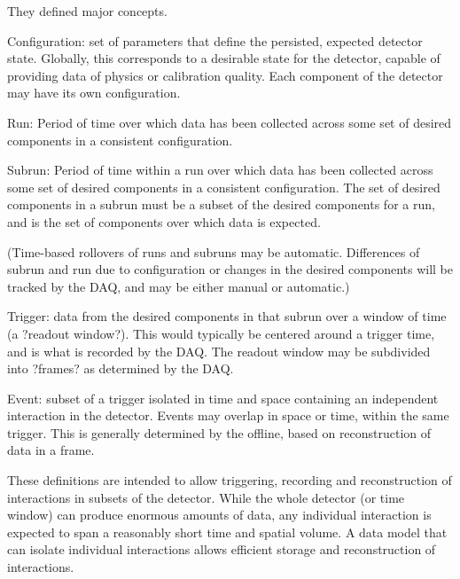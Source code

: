 They defined major concepts.

\begin{description}

\item{Configuration:} set of parameters that define the persisted, expected detector state. Globally, this corresponds to a desirable state for the detector, capable of providing data of physics or calibration quality. Each component of the detector may have its own configuration.
 
\item{Run:} Period of time over which data has been collected across some set of desired components in a consistent configuration.
 
\item{Subrun:} Period of time within a run over which data has been collected across some set of desired components in a consistent configuration. The set of desired components in a subrun must be a subset of the desired components for a run, and is the set of components over which data is expected.
 
(Time-based rollovers of runs and subruns may be automatic. Differences of subrun and run due to configuration or changes in the desired components will be tracked by the DAQ, and may be either manual or automatic.)
 
\item{Trigger:} data from the desired components in that subrun over a window of time (a ?readout window?). This would typically be centered around a trigger time, and is what is recorded by the DAQ. The readout window may be subdivided into ?frames? as determined by the DAQ.
 
\item{Event:} subset of a trigger isolated in time and space containing an independent interaction in the detector. Events may overlap in space or time, within the same trigger. This is generally determined by the offline, based on reconstruction of data in a frame.

\end{description}

These definitions are intended to allow triggering, recording and reconstruction of interactions in subsets of the detector. While the whole detector (or time window) can produce enormous amounts of data, any individual interaction is expected to span a reasonably short time and spatial volume. A data model that can isolate individual interactions  allows efficient storage and reconstruction of interactions. 



